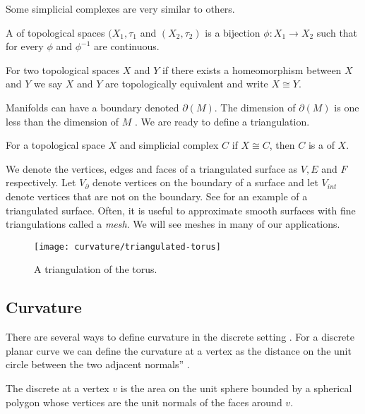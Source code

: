 Some simplicial complexes are very similar to others.


\begin{definition}[Homeomorphism]
A    of topological spaces $(X_1,\tau_1$ and $(X_2,\tau_2)$
is a bijection $\phi:X_1\to X_2$ such that for every $\phi$ and $\phi^{-1}$ are continuous.
\end{definition}
For two topological spaces $X$ and $Y$ if there exists a  homeomorphism between
$X$ and $Y$ we say $X$ and $Y$ are topologically  equivalent and write  $X\cong Y.$

Manifolds can have a boundary denoted $\partial(M)$.
The dimension of $\partial(M)$ is one less than the dimension of $M$ .
We are ready to define a triangulation.

\begin{definition}[Triangulation]
For a topological space $X$ and simplicial complex $C$ if $X\cong C$,
then $C$  is a  of $X$.
\end{definition}

We denote the vertices, edges and faces of a triangulated surface as $V, E$ and $F$ respectively.
Let $V_{\partial}$ denote vertices on the boundary of a surface and let $V_{int}$ 
denote vertices that are not on the boundary.
See  for an example of a triangulated surface.
Often, it is useful to approximate smooth surfaces with fine triangulations called
a \emph{mesh}. We will see meshes in many of our applications.


\begin{figure}[htb]
\centering
\texttt{[image: curvature/triangulated-torus]}
\caption{A triangulation of the torus.}
\label{fig:triangulated-torus}
\end{figure}

\subsection{Curvature}



There are several ways to define curvature in the discrete setting \cite{Crane:2013}.
For a discrete planar curve we can define the curvature at a vertex as the distance on the unit circle between the two adjacent normals'' \cite{Crane:2013}.

\begin{definition}\label{def:discrete-curvature-vertex}

The discrete  at a vertex $v$ is the area on the unit sphere bounded by a spherical polygon whose vertices are the unit normals of the faces around $v$.

\end{definition}


